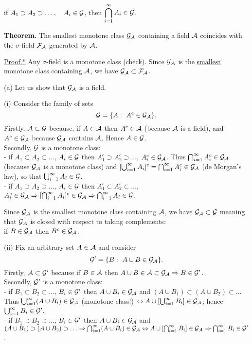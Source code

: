 \documentclass[a4paper,10pt]{article}
\newcommand{\1}[1]{\mathbf{1}_{\{#1\}}}
\begin{document}
if $A_1\supset A_2\supset\ldots,~~~A_i\in{\cal G}$,  then  $\displaystyle\bigcap_{i=1}^\infty A_i\in{\cal G}$. \vspace{5mm}

{\bf Theorem.} The smallest monotone class $\cal G_A$ containing a field $\cal A$ coincides with the $\sigma$-field $\cal F_A$ generated by $\cal A$.

\underline{Proof.*} Any $\sigma$-field is a monotone class (check). Since $\cal G_A$ is the \underline{smallest} monotone class containing $\cal A$, we have ${\cal G_A}\subset{\cal F_A}$.

(a) Let us show that $\cal G_A$ is a field.

(i) Consider the family of sets
  $${\cal G}=\{A:~A^c\in{\cal G_A}\}.$$
Firstly, ${\cal A}\subset {\cal G}$ because, if $A\in{\cal A}$ then $A^c\in{\cal A}$ (because ${\cal A}$ is a field), and $A^c\in{\cal G_A}$ because $\cal G_A$ contains $\cal A$. Hence $A\in{\cal G}$.\\
Secondly, $\cal G$ is a monotone class:\\
- if $A_1\subset A_2\subset \ldots$, $A_i\in{\cal G}$ then $A^c_1\supset A^c_2\supset\ldots$, $A^c_i\in{\cal G_A}$. Thus $\bigcap_{i=1}^\infty A^c_i\in {\cal G_A}$ (because $\cal G_A$ is a monotone class) and $[\bigcup_{i=1}^\infty A_i]^c=\bigcap_{i=1}^\infty A^c_i\in{\cal G_A}$ (de Morgan's law), so that $\bigcup_{i=1}^\infty A_i\in{\cal G}$.\\
- if $A_1\supset A_2\supset \ldots$, $A_i\in{\cal G}$ then $A^c_1\subset A^c_2\subset\ldots$, $A^c_i\in{\cal G_A}\Rightarrow [\bigcap_{i=1}^\infty A_i]^c\in{\cal G_A}\Rightarrow \bigcap_{i=1}^\infty A_i\in{\cal G}$.

Since $\cal G_A$ is the \underline{smallest} monotone class containing $\cal A$, we have ${\cal G_A}\subset{\cal G}$ meaning that $\cal G_A$ is closed with respect to taking complements:\\
if $B\in{\cal G_A}$ then $B^c\in{\cal G_A}$.

(ii) Fix an arbitrary set $A\in{\cal A}$ and consider
  $${\cal G}'=\{B:~A\cup B\in{\cal G_A}\}.$$
Firstly, ${\cal A}\subset {\cal G}'$ because if $B\in{\cal A}$ then $A\cup B\in{\cal A}\subset{\cal G_A}\Rightarrow B\in{\cal G}'$.\\
Secondly, ${\cal G}'$ is a monotone class:\\
- if $B_1\subset B_2\subset \ldots$, $B_i\in{\cal G}'$ then $A\cup B_i\in{\cal G_A}$ and $(A\cup B_1)\subset (A\cup B_2)\subset\ldots$ Thus $\bigcup_{i=1}^\infty (A\cup B_i)\in{\cal G_A}$ (monotone class!) $\Leftrightarrow A\cup[\bigcup_{i=1}^\infty B_i]\in{\cal G_A}$; hence $\bigcup_{i=1}^\infty B_i\in{\cal G}'$.\\
- if $B_1\supset B_2\supset \ldots$, $B_i\in{\cal G}'$ then $A\cup B_i\in{\cal G_A}$ and $(A\cup B_1)\supset (A\cup B_2)\supset\ldots \Rightarrow \bigcap_{i=1}^\infty (A\cup B_i)\in{\cal G_A}\Leftrightarrow A\cup[\bigcap_{i=1}^\infty B_i]\in{\cal G_A}\Rightarrow \bigcap_{i=1}^\infty B_i\in{\cal G}'$.
\end{document}
